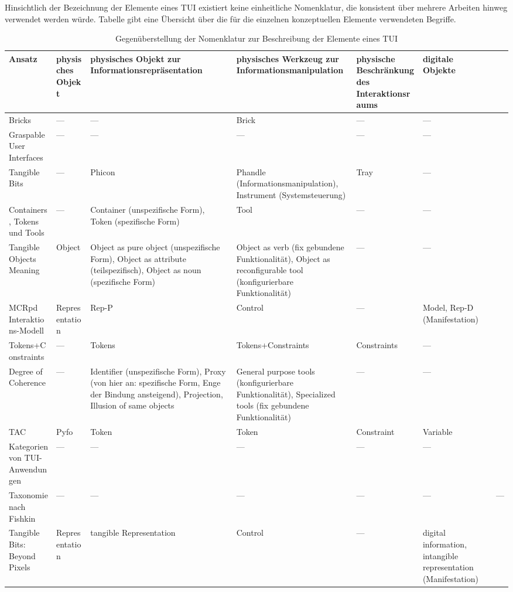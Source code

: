 Hinsichtlich der Bezeichnung der Elemente eines \gls{TUI} existiert keine einheitliche Nomenklatur, die konsistent über mehrere Arbeiten hinweg verwendet werden würde. Tabelle \label{tab:tui_nomenklatur} gibt eine Übersicht über die für die einzelnen konzeptuellen Elemente verwendeten Begriffe.

\begin{longtable}{| p{} || p{} | p{} | p{} | p{} | p{} |} 
	\caption{Gegenüberstellung der Nomenklatur zur Beschreibung der Elemente eines TUI} 	\label{tab:tui_nomenklatur} \\
	\hline
	Ansatz & physisches Objekt & physisches Objekt zur Informations\-repräsentation & physisches Werkzeug zur Informations\-manipulation & physische Beschränkung des Interaktionsraums & digitale Objekte \\ \hline \hline
	Bricks & --- & --- & Brick & --- & --- \\ \hline
	Graspable User Interfaces & --- & --- & --- & --- & --- \\ \hline
	Tangible Bits & --- & Phicon & Phandle (Informationsmanipulation), Instrument (Systemsteuerung) & Tray & --- \\ \hline
	Containers, Tokens und Tools & --- & Container (unspezifische Form), Token (spezifische Form) & Tool & --- & --- \\ \hline
	Tangible Objects Meaning & Object & Object as pure object (unspezifische Form), Object as attribute (teilspezifisch), Object as noun (spezifische Form) & Object as verb (fix gebundene Funktionalität), Object as reconfigurable tool (konfigurierbare Funktionalität) & --- & --- \\ \hline
	MCRpd Interaktions-Modell & Representation & Rep-P & Control & --- & Model, Rep-D (Manifestation)\\ \hline
	Tokens+Constraints & --- & Tokens & Tokens+Constraints & Constraints & --- \\ \hline
	Degree of Coherence & --- & Identifier (unspezifische Form), Proxy (von hier an: spezifische Form, Enge der Bindung ansteigend), Projection, Illusion of same objects & General purpose tools (konfigurierbare Funktionalität), Specialized tools (fix gebundene Funktionalität) & --- & --- \\ \hline
	TAC & Pyfo & Token & Token & Constraint & Variable \\ \hline
	Kategorien von TUI-Anwendungen & --- & --- & --- & --- & --- \\ \hline
	Taxonomie nach Fishkin & --- & --- & --- & --- & --- & --- \\ \hline
	Tangible Bits: Beyond Pixels & Representation & tangible Representation & Control & --- & digital information, intangible representation (Manifestation) \\ \hline
\end{longtable}

